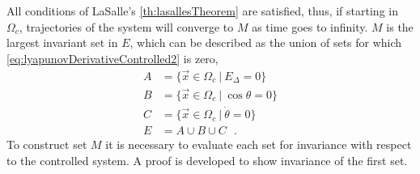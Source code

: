 All conditions of LaSalle's \autoref{th:lasallesTheorem} are satisfied, thus, if starting in $\Omega_c$, trajectories of the system will converge to $M$ as time goes to infinity. $M$ is the largest invariant set in $E$, which can be described as the union of sets for which \autoref{eq:lyapunovDerivativeControlled2} is zero,
\begin{align}
  A &=  \{ \vec{x} \in \Omega_c \ | \ E_\Delta     = 0 \}      \\
  B &=  \{ \vec{x} \in \Omega_c \ | \ \cos \theta  = 0 \}  \\
  C &=  \{ \vec{x} \in \Omega_c \ | \ \dot{\theta} = 0 \}  \\
  E &= A \cup B \cup C \ \ \ . \label{eq:E}
\end{align}
To construct set $M$ it is necessary to evaluate each set for invariance with respect to the controlled system. A proof is developed to show invariance of the first set.
